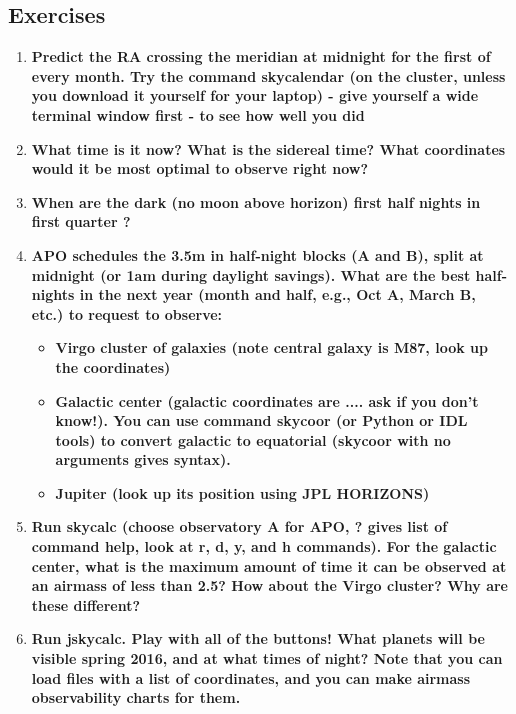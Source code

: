 \documentclass{article}
\begin{document}
\subsection*{Exercises}
\begin{enumerate}[1.]
    \item \textbf{Predict the RA crossing the meridian at midnight for the
    first of every month. Try the command skycalendar (on the cluster,
    unless you download it yourself for your laptop) - give yourself a
    wide terminal window first - to see how well you did}

    \item \textbf{What time is it now? What is the sidereal time? What
    coordinates would it be most optimal to observe right now?}

    \item \textbf{When are the dark (no moon above horizon) first half
    nights in first quarter ? }

    \item \textbf{APO schedules the 3.5m in half-night blocks (A and
    B), split at midnight (or 1am during daylight savings). What are
    the best half-nights in the next year (month and half, e.g., Oct
    A, March B, etc.) to request to observe:}
        \begin{itemize}
            \item \textbf{Virgo cluster of galaxies (note central
            galaxy is M87, look up the coordinates)}
            \item \textbf{Galactic center (galactic coordinates are
            .... ask if you don't know!). You can use command skycoor
            (or Python or IDL tools) to convert galactic to equatorial
            (skycoor with no arguments gives syntax). }
            \item \textbf{Jupiter (look up its position using JPL
            HORIZONS) }
        \end{itemize}

    \item \textbf{Run skycalc (choose observatory A for APO, ? gives
    list of command help, look at r, d, y, and h commands). For the
    galactic center, what is the maximum amount of time it can be
    observed at an airmass of less than 2.5? How about the Virgo
    cluster? Why are these different?}

    \item \textbf{Run jskycalc. Play with all of the buttons! What
    planets will be visible spring 2016, and at what times of night?
    Note that you can load files with a list of coordinates, and you
    can make airmass observability charts for them.}


\end{enumerate}
\end{document}
